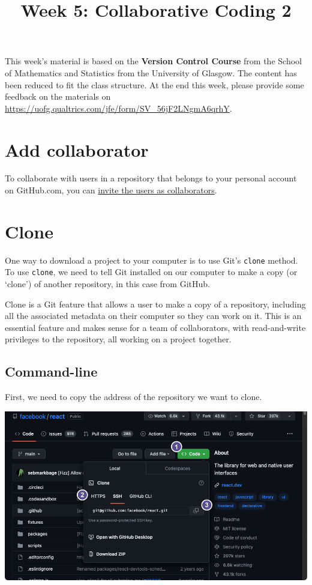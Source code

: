 \documentclass[
  letterpaper,
  DIV=11,
  numbers=noendperiod]{scrartcl}
\title{Week 5: Collaborative Coding 2}
\author{}
\date{}
\begin{document}
\maketitle


This week's material is based on the \textbf{Version Control Course}
from the School of Mathematics and Statistics from the University of
Glasgow. The content has been reduced to fit the class structure. At the
end this week, please provide some feedback on the materials on
\url{https://uofg.qualtrics.com/jfe/form/SV_56jF2LNgmA6qrhY}.

\section{Add collaborator}\label{add-collaborator}

To collaborate with users in a repository that belongs to your personal
account on GitHub.com, you can
\href{https://docs.github.com/en/account-and-profile/setting-up-and-managing-your-personal-account-on-github/managing-access-to-your-personal-repositories/inviting-collaborators-to-a-personal-repository}{invite
the users as collaborators}.

\section{Clone}\label{clone}

One way to download a project to your computer is to use Git's
\texttt{clone} method. To use \texttt{clone}, we need to tell Git
installed on our computer to make a copy (or `clone') of another
repository, in this case from GitHub.

Clone is a Git feature that allows a user to make a copy of a
repository, including all the associated metadata on their computer so
they can work on it. This is an essential feature and makes sense for a
team of collaborators, with read-and-write privileges to the repository,
all working on a project together.

\subsection{Command-line}

First, we need to copy the address of the repository we want to clone.

\includegraphics{images/image23.png}
\end{document}
